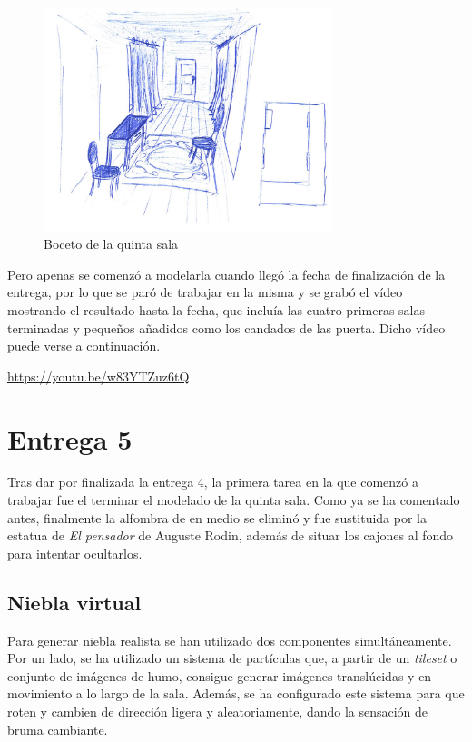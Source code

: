 \begin{figure}[!h]
\begin{center}
\includegraphics[width=0.75\textwidth]{imagenes/7/bocetos/boceto-sala-5.png}
\caption{Boceto de la quinta sala}
\label{fig:boceto-sala-5}
\end{center}
\end{figure}

Pero apenas se comenzó a modelarla cuando llegó la fecha de finalización de la entrega, por lo que se paró de trabajar en la misma y se grabó el vídeo mostrando el resultado hasta la fecha, que incluía las cuatro primeras salas terminadas y pequeños añadidos como los candados de las puerta. Dicho vídeo puede verse a continuación.

\begin{center}
    \url{https://youtu.be/w83YTZuz6tQ}
\end{center}



\section{Entrega 5}

Tras dar por finalizada la entrega 4, la primera tarea en la que comenzó a trabajar fue el terminar el modelado de la quinta sala. Como ya se ha comentado antes, finalmente la alfombra de en medio se eliminó y fue sustituida por la estatua de \textit{El pensador} de Auguste Rodin, además de situar los cajones al fondo para intentar ocultarlos. 

\subsection{Niebla virtual}

Para generar niebla realista se han utilizado dos componentes simultáneamente. Por un lado, se ha utilizado un sistema de partículas  que, a partir de un \textit{tileset} o conjunto de imágenes de humo, consigue generar imágenes translúcidas y en movimiento a lo largo de la sala. Además, se ha configurado este sistema para que roten y cambien de dirección ligera y aleatoriamente, dando la sensación de bruma cambiante. 

